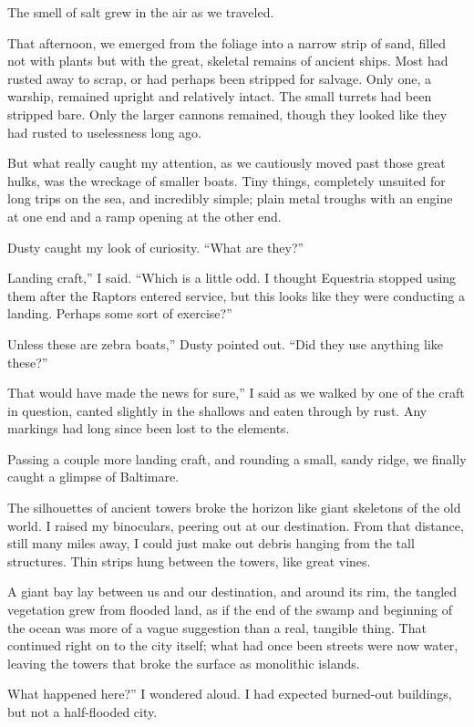 The smell of salt grew in the air as we traveled.

That afternoon, we emerged from the foliage into a narrow strip of sand, filled not with plants but with the great, skeletal remains of ancient ships. Most had rusted away to scrap, or had perhaps been stripped for salvage. Only one, a warship, remained upright and relatively intact. The small turrets had been stripped bare. Only the larger cannons remained, though they looked like they had rusted to uselessness long ago.

But what really caught my attention, as we cautiously moved past those great hulks, was the wreckage of smaller boats. Tiny things, completely unsuited for long trips on the sea, and incredibly simple; plain metal troughs with an engine at one end and a ramp opening at the other end.

Dusty caught my look of curiosity. “What are they?”

\leavevmode{}Landing craft,” I said. “Which is a little odd. I thought Equestria stopped using them after the Raptors entered service, but this looks like they were conducting a landing. Perhaps some sort of exercise?”

\leavevmode{}Unless these are zebra boats,” Dusty pointed out. “Did they use anything like these?”

\leavevmode{}That would have made the news for sure,” I said as we walked by one of the craft in question, canted slightly in the shallows and eaten through by rust. Any markings had long since been lost to the elements.

Passing a couple more landing craft, and rounding a small, sandy ridge, we finally caught a glimpse of Baltimare.

The silhouettes of ancient towers broke the horizon like giant skeletons of the old world. I raised my binoculars, peering out at our destination. From that distance, still many miles away, I could just make out debris hanging from the tall structures. Thin strips hung between the towers, like great vines.

A giant bay lay between us and our destination, and around its rim, the tangled vegetation grew from flooded land, as if the end of the swamp and beginning of the ocean was more of a vague suggestion than a real, tangible thing. That continued right on to the city itself; what had once been streets were now water, leaving the towers that broke the surface as monolithic islands.

\leavevmode{}What happened here?” I wondered aloud. I had expected burned-out buildings, but not a half-flooded city.

